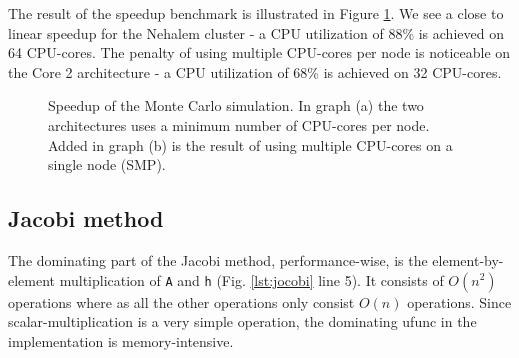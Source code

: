 \documentclass[10pt]{article}
\begin{document}
The result of the speedup benchmark is illustrated in Figure \ref{fig:MonteCarlo}. We see a close to linear speedup for the Nehalem cluster - a CPU utilization of 88\% is achieved on 64 CPU-cores. The penalty of using multiple CPU-cores per node is noticeable on the Core 2 architecture - a CPU utilization of 68\% is achieved on 32 CPU-cores.

\begin{figure}%
  \begin{center}%
    \caption{Speedup of the Monte Carlo simulation. In graph (a) the two architectures uses a minimum number of CPU-cores per node. Added in graph (b) is the result of using multiple CPU-cores on a single node (SMP).}%
    \label{fig:MonteCarlo}%
  \end{center}
\end{figure}


\subsection{Jacobi method}
The dominating part of the Jacobi method, performance-wise, is the element-by-element multiplication of \texttt{A} and \texttt{h} (Fig. \ref{lst:jocobi} line 5). It consists of $O(n^2)$ operations where as all the other operations only consist $O(n)$ operations. Since scalar-multiplication is a very simple operation, the dominating ufunc in the implementation is memory-intensive.
\end{document}
